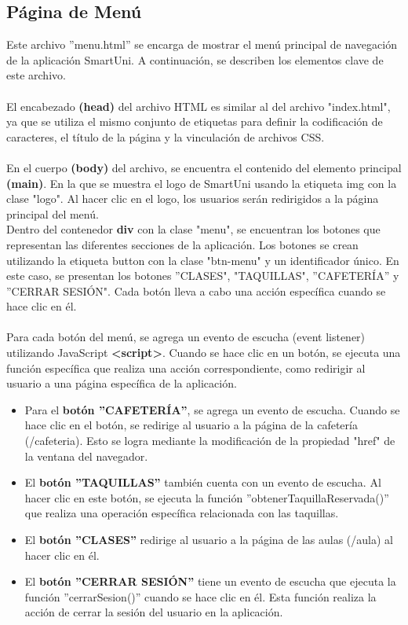 \documentclass[12pt]{report}
\begin{document}
\subsection{Página de Menú}
Este archivo ''menu.html'' se encarga de mostrar el menú principal de navegación de la aplicación SmartUni. A continuación, se describen los elementos clave de este archivo.
\\\\
El encabezado \textbf{(head) }del archivo HTML es similar al del archivo "index.html", ya que se utiliza el mismo conjunto de etiquetas para definir la codificación de caracteres, el título de la página y la vinculación de archivos CSS. \\\\
En el cuerpo \textbf{(body)} del archivo, se encuentra el contenido del elemento principal\textbf{ (main)}. En la que se muestra el logo de SmartUni usando la etiqueta img con la clase "logo". Al hacer clic en el logo, los usuarios serán redirigidos a la página principal del menú.
\\
Dentro del contenedor \textbf{div} con la clase "menu", se encuentran los botones que representan las diferentes secciones de la aplicación. Los botones se crean utilizando la etiqueta button con la clase "btn-menu" y un identificador único. En este caso, se presentan los botones ''CLASES", "TAQUILLAS", ''CAFETERÍA'' y ''CERRAR SESIÓN". Cada botón lleva a cabo una acción específica cuando se hace clic en él.
\\\\
Para cada botón del menú, se agrega un evento de escucha (event listener) utilizando JavaScript \textbf{\textless script\textgreater}. Cuando se hace clic en un botón, se ejecuta una función específica que realiza una acción correspondiente, como redirigir al usuario a una página específica de la aplicación.
\begin{itemize}
    \item Para el\textbf{ botón ''CAFETERÍA''}, se agrega un evento de escucha. Cuando se hace clic en el botón, se redirige al usuario a la página de la cafetería (/cafeteria). Esto se logra mediante la modificación de la propiedad "href" de la ventana del navegador.
    
    \item El \textbf{botón ''TAQUILLAS''} también cuenta con un evento de escucha. Al hacer clic en este botón, se ejecuta la función ''obtenerTaquillaReservada()'' que realiza una operación específica relacionada con las taquillas.
    
    \item El \textbf{botón ''CLASES'' }redirige al usuario a la página de las aulas (/aula) al hacer clic en él.
    
    \item El \textbf{botón ''CERRAR SESIÓN'' }tiene un evento de escucha que ejecuta la función ''cerrarSesion()'' cuando se hace clic en él. Esta función realiza la acción de cerrar la sesión del usuario en la aplicación.
\end{itemize}
\end{document}
